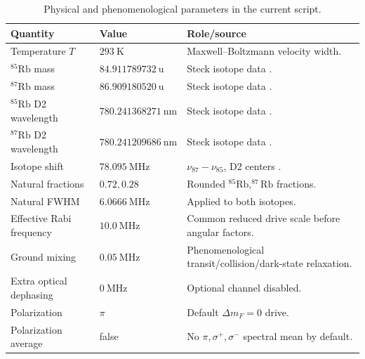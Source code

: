 \begin{table}[h]
\centering
\small
\renewcommand{\arraystretch}{1.12}
\caption{Physical and phenomenological parameters in the current script.}
\label{tab:dm_physical_parameters}
\begin{tabularx}{\textwidth}{p{3.8cm}p{3.0cm}X}
\toprule
Quantity & Value & Role/source \\
\midrule
Temperature \(T\) & \(293~\mathrm{K}\) & Maxwell--Boltzmann velocity width. \\
\(^{85}\mathrm{Rb}\) mass &
\(84.911789732~\mathrm{u}\) & Steck isotope data \cite{Steck85}. \\
\(^{87}\mathrm{Rb}\) mass &
\(86.909180520~\mathrm{u}\) & Steck isotope data \cite{Steck87}. \\
\(^{85}\mathrm{Rb}\) D2 wavelength &
\(780.241368271~\mathrm{nm}\) & Steck isotope data \cite{Steck85}. \\
\(^{87}\mathrm{Rb}\) D2 wavelength &
\(780.241209686~\mathrm{nm}\) & Steck isotope data \cite{Steck87}. \\
Isotope shift & \(78.095~\mathrm{MHz}\) &
\(\nu_{87}-\nu_{85}\), D2 centers \cite{Steck85}. \\
Natural fractions & \(0.72,0.28\) &
Rounded \(^{85}\mathrm{Rb},^{87}\mathrm{Rb}\) fractions. \\
Natural FWHM & \(6.0666~\mathrm{MHz}\) &
Applied to both isotopes. \\
Effective Rabi frequency & \(10.0~\mathrm{MHz}\) &
Common reduced drive scale before angular factors. \\
Ground mixing & \(0.05~\mathrm{MHz}\) &
Phenomenological transit/collision/dark-state relaxation. \\
Extra optical dephasing & \(0~\mathrm{MHz}\) &
Optional channel disabled. \\
Polarization & \(\pi\) &
Default \(\Delta m_F=0\) drive. \\
Polarization average & false &
No \(\pi,\sigma^+,\sigma^-\) spectral mean by default. \\
\bottomrule
\end{tabularx}
\end{table}


